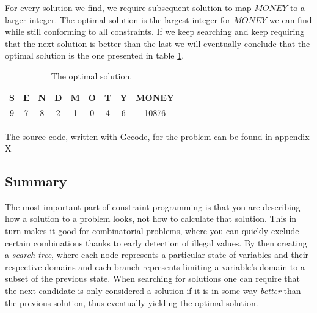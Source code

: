 For every solution we find, we require subsequent solution to map $MONEY$ to a larger
integer. The optimal solution is the largest integer for $MONEY$ we can find while still
conforming to all constraints. If we keep searching and keep requiring that the next solution
is better than the last we will eventually conclude that the optimal solution is the one
presented in table \ref{tab:optimal_solution}.

\begin{table}
	\centering
	\begin{tabular}{c|c|c|c|c|c|c|c|c}
		S & E & N & D & M & O & T & Y & MONEY \\
		\hline
		9 & 7 & 8 & 2 & 1 & 0 & 4 & 6 & 10876 \\
	\end{tabular}
	\caption{The optimal solution.}
	\label{tab:optimal_solution}
\end{table}

The source code, written with Gecode, for the problem can be found in appendix X

\subsection{Summary}
The most important part of constraint programming is that you are describing how a
solution to a problem looks, not how to calculate that solution. This in turn makes it
good for combinatorial problems, where you can quickly exclude certain combinations thanks
to early detection of illegal values. By then creating a \textit{search tree}, where each
node represents a particular state of variables and their respective domains and each
branch represents limiting a variable's domain to a subset of the previous state. When
searching for solutions one can require that the next candidate is only considered a solution
if it is in some way \textit{better} than the previous solution, thus eventually yielding
the optimal solution.
